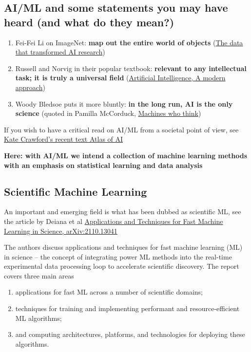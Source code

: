 \documentclass[%
oneside,                 %
final,                   %
10pt]{article}
\begin{document}
\subsection{AI/ML and some statements you may have heard (and what do they mean?)}

\begin{enumerate}
\item Fei-Fei Li on ImageNet: \textbf{map out the entire world of objects} (\href{{https://cacm.acm.org/news/219702-the-data-that-transformed-ai-research-and-possibly-the-world/fulltext}}{The data that transformed AI research})

\item Russell and Norvig in their popular textbook: \textbf{relevant to any intellectual task; it is truly a universal field} (\href{{http://aima.cs.berkeley.edu/}}{Artificial Intelligence, A modern approach})

\item Woody Bledsoe puts it more bluntly: \textbf{in the long run, AI is the only science} (quoted in Pamilla McCorduck, \href{{https://www.pamelamccorduck.com/machines-who-think}}{Machines who think})
\end{enumerate}

\noindent
If you wish to have a critical read on AI/ML from a societal point of view, see \href{{https://www.katecrawford.net/}}{Kate Crawford's recent text Atlas of AI}

\textbf{Here: with AI/ML we intend a collection of machine learning methods with an emphasis on statistical learning and data analysis}

\subsection{Scientific Machine Learning}

An important and emerging field is what has been dubbed as scientific ML, see the article by Deiana et al \href{{https://arxiv.org/abs/2110.13041}}{Applications and Techniques for Fast Machine Learning in Science, arXiv:2110.13041}

\begin{block}{}
The authors discuss applications and techniques for fast machine
learning (ML) in science -- the concept of integrating power ML
methods into the real-time experimental data processing loop to
accelerate scientific discovery. The report covers three main areas

\begin{enumerate}
\item applications for fast ML across a number of scientific domains;

\item techniques for training and implementing performant and resource-efficient ML algorithms;

\item and computing architectures, platforms, and technologies for deploying these algorithms.
\end{enumerate}

\noindent
\end{block}
\end{document}
